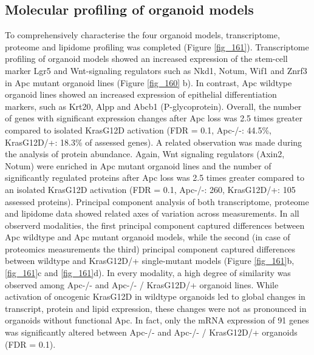 \begin{flushleft}
\section{Molecular profiling of organoid models}
To comprehensively characterise the four organoid models, transcriptome, proteome and lipidome profiling was completed (Figure \ref{fig_161}). Transcriptome profiling of organoid models showed an increased expression of the stem-cell marker Lgr5 and Wnt-signaling regulators such as Nkd1, Notum, Wif1 and Znrf3 in Apc mutant organoid lines (Figure \ref{fig_160} b). In contrast, Apc wildtype organoid lines showed an increased expression of epithelial differentiation markers, such as Krt20, Alpp and Abcb1 (P-glycoprotein). Overall, the number of genes with significant expression changes after Apc loss was 2.5 times greater compared to isolated KrasG12D activation (FDR = 0.1, Apc-/-: 44.5\%, KrasG12D/+: 18.3\% of assessed genes). A related observation was made during the analysis of protein abundance. Again, Wnt signaling regulators (Axin2, Notum) were enriched in Apc mutant organoid lines and the number of significantly regulated proteins after Apc loss was 2.5 times greater compared to an isolated KrasG12D activation (FDR = 0.1, Apc-/-: 260, KrasG12D/+: 105 assessed proteins). Principal component analysis of both transcriptome, proteome and lipidome data showed related axes of variation across measurements. In all observerd modalities, the first principal component captured differences between Apc wildtype and Apc mutant organoid models, while the second (in case of proteomics measurements the third) principal component captured differences between wildtype and KrasG12D/+ single-mutant models (Figure \ref{fig_161}b, \ref{fig_161}c and \ref{fig_161}d). In every modality, a high degree of similarity was observed among Apc-/- and Apc-/- / KrasG12D/+ organoid lines. While activation of oncogenic KrasG12D in wildtype organoids led to global changes in transcript, protein and lipid expression, these changes were not as pronounced in organoids without functional Apc. In fact, only the mRNA expression of 91 genes was significantly altered between Apc-/- and Apc-/- / KrasG12D/+ organoids (FDR = 0.1). 


\end{flushleft}
